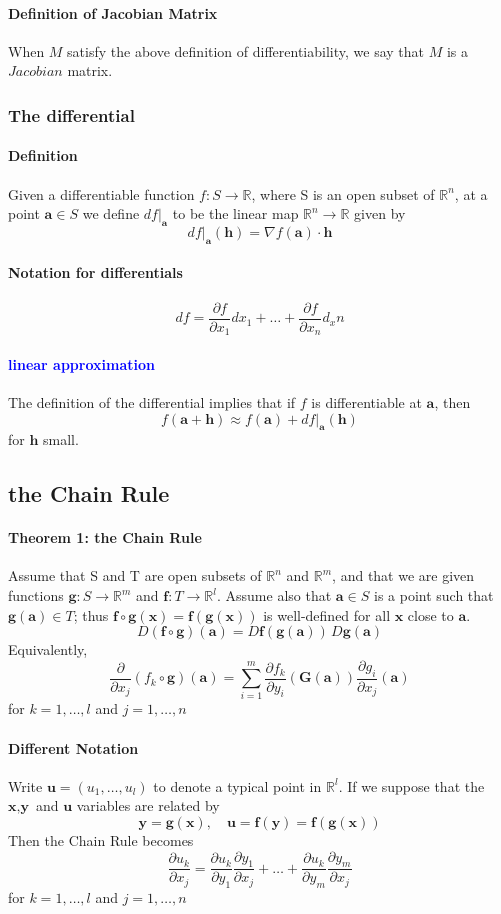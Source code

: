 \documentclass[11pt]{article}
\newcommand{\tb}[1]{\textbf{#1}}
\newcommand{\real}[0]{\mathbb{R}}
\newcommand{\vx}[0]{\tb{x}}
\newcommand{\vy}[0]{\tb{y}}
\newcommand{\va}[0]{\tb{a}}
\newcommand{\vh}[0]{\tb{h}}
\newcommand{\vg}[0]{\tb{G}}
\newcommand{\vu}[0]{\tb{u}}
\newcommand{\ff}[0]{\tb{f}}
\newcommand{\fg}[0]{\tb{g}}
\newcommand{\p}[0]{\partial}
\begin{document}
\paragraph{Definition of Jacobian Matrix}
When $M$ satisfy the above definition of differentiability, we say that $M$ is a $Jacobian$ matrix.
\subsubsection{The differential}
\paragraph{Definition} Given a differentiable function $f: S \rightarrow \real$, where S is an open subset of $\real^n$, at a point $\va \in S$ we define $df|_{\va}$ to be the linear map $\real^n \rightarrow \real$ given by
$$df|_{\va}(\vh) = \nabla f(\va)\cdot \vh$$
\paragraph{Notation for differentials}
$$df = \frac{\p f}{\p x_1} dx_1 + \hdots + \frac{\p f}{\p x_n} d_xn$$
\paragraph{\textcolor{blue}{linear approximation}} The definition of the differential implies that if $f$ is differentiable at $\va$, then
$$f(\va + \vh) \approx f(\va) + df|_{\va}(\vh)$$
for $\vh$ small.
\subsection{the Chain Rule}
\paragraph{Theorem 1: the Chain Rule} Assume that S and T are open subsets of $\real^n$ and $\real^m$, and that we are given functions $\fg: S \rightarrow \real^m$ and $\ff: T \rightarrow \real^l$. Assume also that $\va \in S$ is a point such that $\fg(\va) \in T$; thus $\ff \circ \fg(\vx) = \ff(\fg(\vx))$ is well-defined for all $\vx$ close to $\va$. \\
$$D(\ff \circ \fg)(\va) = D\ff(\fg(\va)) \, D\fg(\va)$$
Equivalently, $$\frac{\p}{\p x_j}(f_k \circ \fg)(\va) = \sum_{i=1}^m \frac{\p f_k}{\p y_i}(\vg(\va)) \frac{\p g_i}{\p x_j}(\va)$$ for $k = 1, \hdots, l$ and $j = 1,\hdots, n$
\paragraph{Different Notation}
Write $\vu = (u_1,\hdots,u_l)$ to denote a typical point in $\real^l$. If we suppose that the $\vx, \vy$ and $\vu$ variables are related by
$$\vy = \fg(\vx), \quad \vu = \ff(\vy) = \ff(\fg(\vx))$$
Then the Chain Rule becomes
$$\frac{\p u_k}{\p x_j} = \frac{\p u_k}{\p y_1}\frac{\p y_1}{\p x_j} + \hdots + \frac{\p u_k}{\p y_m}\frac{\p y_m}{\p x_j}$$
for $k = 1,\hdots, l$ and $j = 1,\hdots,n$
\end{document}
